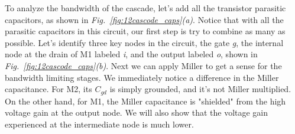 To analyze the bandwidth of the cascade, let's add all the transistor parasitic capacitors, as shown in \emph{Fig.~\ref{fig:12cascode_caps}(a)}.  Notice that with all the parasitic capacitors in this circuit, our first step is try to combine as many as possible.   Let's identify three key nodes in the circuit, the gate \emph{g}, the internal node at the drain of M1 labeled \emph{i}, and the output labeled \emph{o}, shown in \emph{Fig.~\ref{fig:12cascode_caps}(b)}.  Next we can apply Miller to get a sense for the bandwidth limiting stages.  We immediately notice a difference in the Miller capacitance.  For M2, its $C_{gd}$ is simply grounded, and it's not Miller multiplied.  On the other hand, for M1, the Miller capacitance is "shielded" from the high voltage gain at the output node.  We will also show that the voltage gain experienced at the intermediate node is much lower.  
